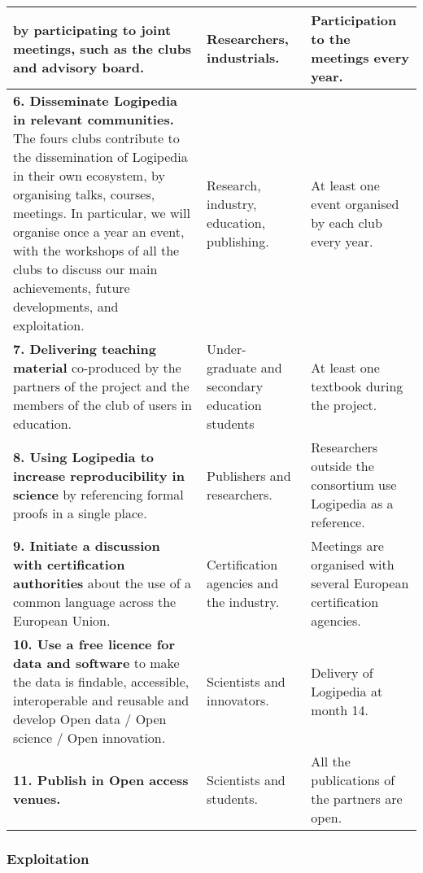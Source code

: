 \begin{longtable*}{|p{0.55\textwidth}|p{0.12\textwidth}|p{0.15\textwidth}|}
by participating to joint meetings, such as
the clubs and advisory board.
&
Researchers, industrials.
&
Participation to the meetings
every year.
\\
\hline
{\bf 6. Disseminate Logipedia in relevant communities.}
The fours clubs contribute to the dissemination of
Logipedia in their own ecosystem, by organising talks,
courses, meetings.
In particular, we will organise once a year an event, 
with the workshops of all the clubs to discuss our main achievements,
future developments, and exploitation.
&
Research, industry,
education, publishing.
&
At least one event organised by each club every year.
\\
\hline
{\bf 7. Delivering teaching material}
co-produced by 
the partners of the project and the members of
the club of users in education. 
&
Under- graduate and secondary education students
&
At least one textbook during the project.
\\
\hline
{\bf 8. Using Logipedia to increase reproducibility in science}
by referencing formal proofs in a single place. 
&
Publishers and researchers.
&
Researchers outside the consortium use Logipedia as a reference.
\\
\hline
{\bf 9. Initiate a discussion with certification authorities}
about the use of a common language across the European Union.
&
Certification agencies and the industry. 
&
Meetings are organised with several European certification agencies.
\\
\hline
{\bf 10. Use a free licence for data and software} to make 
the data is findable, accessible, interoperable and reusable
and develop Open data / Open science / Open innovation.
&
Scientists and innovators.
&
Delivery of Logipedia at month 14.
\\
\hline
{\bf 11. Publish in Open access venues.}
&
Scientists and students.
&
All the publications of the partners are open.
\\
\hline
\end{longtable*}


\subsubsection*{Exploitation}

